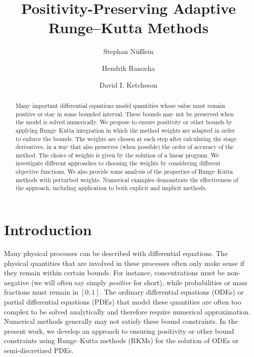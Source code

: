 \documentclass[a4paper]{article}
\title{Positivity-Preserving Adaptive Runge--Kutta Methods}
\author{Stephan Nüßlein \and Hendrik Ranocha \and David I. Ketcheson}
\numberwithin{equation}{section}
\theoremstyle{plain}
\theoremstyle{definition}
\numberwithin{theorem}{section}
\newcommand{\1}{\mathbbm{1}}
\begin{document}
\maketitle

\begin{abstract}
Many important differential equations model quantities whose value
must remain positive or stay in some bounded interval.
These bounds may not be preserved when the model is solved numerically.
We propose to ensure positivity or other bounds by applying Runge--Kutta
integration in which the method weights are adapted in order to
enforce the bounds.  The weights are chosen at each step after calculating the
stage derivatives, in a way that also preserves (when possible) the order of
accuracy of the method.  The choice of weights is given by the solution
of a linear program.
We investigate different approaches to choosing the weights by considering
different objective functions.  We also provide some analysis of the properties
of Runge--Kutta methods with perturbed weights.  Numerical examples demonstrate
the effectiveness of the approach, including application to both explicit and
implicit methods.
\end{abstract}



\section{Introduction}


Many physical processes can be described with differential equations. 
The physical quantities that are involved in these processes often only make sense if they remain within certain bounds.
For instance, concentrations must be non-negative (we will often say simply {\em positive} for short), while
probabilities or mass fractions must remain in $[0,1]$.
The ordinary differential equations (ODEs) or partial differential equations
(PDEs) that model these quantities are often too complex to be solved
analytically and therefore require numerical approximation.
Numerical methods generally may not satisfy these bound constraints.
In the present work, we develop an approach to ensuring positivity
or other bound constraints using Runge--Kutta methods (RKMs) for the
solution of ODEs or semi-discretized PDEs.
\end{document}
